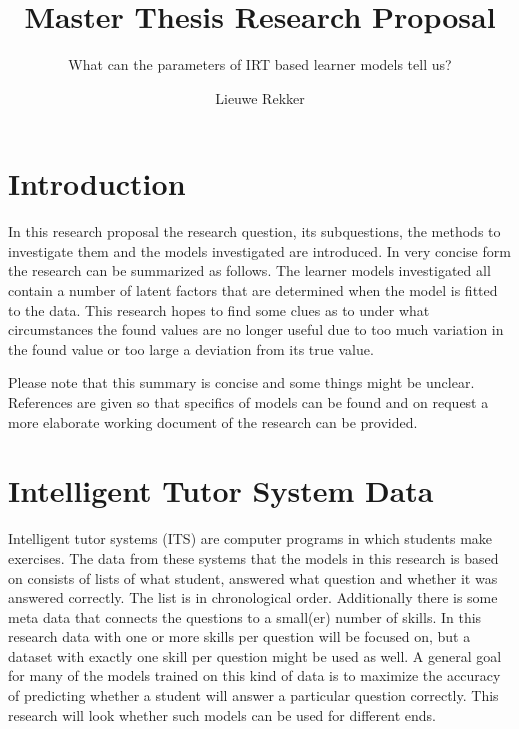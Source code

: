\documentclass{scrartcl}
\begin{document}
\title{Master Thesis Research Proposal}
\subtitle{What can the parameters of IRT based learner models tell us?}
\author{Lieuwe Rekker}
\maketitle


\section{Introduction}
In this research proposal the research question, its subquestions, the methods to investigate them and the models investigated are introduced. In very concise form the research can be summarized as follows. The learner models investigated all contain a number of latent factors that are determined when the model is fitted to the data. This research hopes to find some clues as to under what circumstances the found values are no longer useful due to too much variation in the found value or too large a deviation from its true value.

Please note that this summary is concise and some things might be unclear. References are given so that specifics of models can be found and on request a more elaborate working document of the research can be provided.


\section{Intelligent Tutor System Data}
 Intelligent tutor systems (ITS) are computer programs in which students make exercises. The data from these systems that the models in this research is based on consists of lists of what student, answered what question and whether it was answered correctly. The list is in chronological order. Additionally there is some meta data that connects the questions to a small(er) number of skills. In this research data with one or more skills per question will be focused on, but a dataset with exactly one skill per question might be used as well. A general goal for many of the models trained on this kind of data is to maximize the accuracy of predicting whether a student will answer a particular question correctly. This research will look whether such models can be used for different ends.
\end{document}
